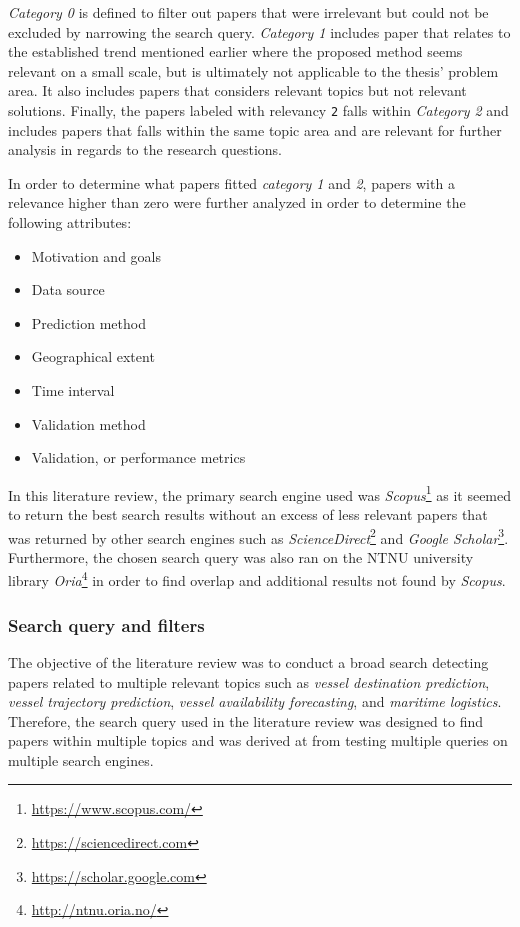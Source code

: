 \textit{Category 0} is defined to filter out papers that were irrelevant but could not be excluded by narrowing the search query. \textit{Category 1} includes paper that relates to the established trend mentioned earlier where the proposed method seems relevant on a small scale, but is ultimately not applicable to the thesis' problem area. It also includes papers that considers relevant topics but not relevant solutions. Finally, the papers labeled with relevancy \texttt{2} falls within \textit{Category 2} and includes papers that falls within the same topic area and are relevant for further analysis in regards to the research questions.

In order to determine what papers fitted \textit{category 1} and \textit{2}, papers with a relevance higher than zero were further analyzed in order to determine the following attributes:

\begin{itemize}
    \item Motivation and goals
    \item Data source
    \item Prediction method
    \item Geographical extent
    \item Time interval
    \item Validation method
    \item Validation, or performance metrics
\end{itemize}

In this literature review, the primary search engine used was \textit{Scopus}\footnote{\url{https://www.scopus.com/}} as it seemed to return the best search results without an excess of less relevant papers that was returned by other search engines such as \textit{ScienceDirect}\footnote{\url{https://sciencedirect.com}} and \textit{Google Scholar}\footnote{\url{https://scholar.google.com}}. Furthermore, the chosen search query was also ran on the \acrshort{NTNU} university library \textit{Oria}\footnote{\url{http://ntnu.oria.no/}} in order to find overlap and additional results not found by \textit{Scopus}.

\subsubsection{Search query and filters}

The objective of the literature review was to conduct a broad search detecting papers related to multiple relevant topics such as \textit{vessel destination prediction}, \textit{vessel trajectory prediction}, \textit{vessel availability forecasting}, and \textit{maritime logistics}. Therefore, the search query used in the literature review was designed to find papers within multiple topics and was derived at from testing multiple queries on multiple search engines.

